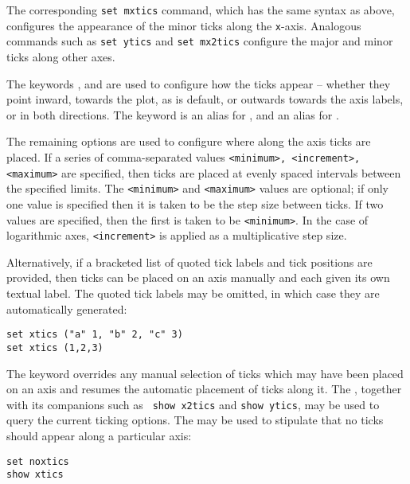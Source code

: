 The corresponding {\tt set mxtics} command, which has the same syntax as above,
configures the appearance of the minor ticks along the {\tt x}-axis. Analogous
commands such as {\tt set ytics} and {\tt set mx2tics} configure the major and
minor ticks along other axes.

The keywords ,  and  are used to
configure how the ticks appear -- whether they point inward, towards the plot,
as is default, or outwards towards the axis labels, or in both directions.  The
keyword  is an alias for , and 
an alias for .

The remaining options are used to configure where along the axis ticks are
placed. If a series of comma-separated values {\tt <minimum>, <increment>,
<maximum>} are specified, then ticks are placed at evenly spaced intervals
between the specified limits. The {\tt <minimum>} and {\tt <maximum>} values
are optional; if only one value is specified then it is taken to be the step
size between ticks. If two values are specified, then the first is taken to be
{\tt <minimum>}. In the case of logarithmic axes, {\tt <increment>} is applied
as a multiplicative step size.

Alternatively, if a bracketed list of quoted tick labels and tick positions are
provided, then ticks can be placed on an axis manually and each given its own
textual label. The quoted tick labels may be omitted, in which case they are
automatically generated:
\begin{verbatim}
set xtics ("a" 1, "b" 2, "c" 3)
set xtics (1,2,3)
\end{verbatim}
The keyword  overrides any manual selection of ticks which
may have been placed on an axis and resumes the automatic placement of ticks
along it. The , together with its companions such as {\tt
show x2tics} and {\tt show ytics}, may be used to query the current ticking
options. The  may be used to stipulate that no ticks
should appear along a particular axis:

\begin{verbatim}
set noxtics
show xtics
\end{verbatim}

